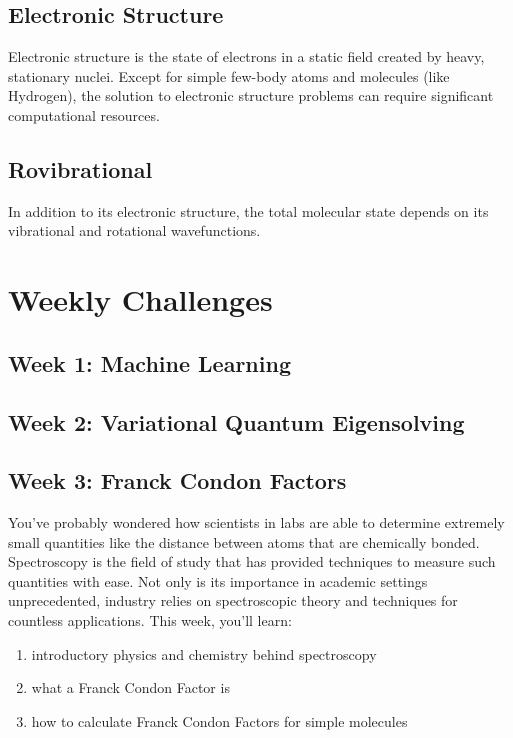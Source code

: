 \documentclass[12pt]{article}
\begin{document}
\subsection*{Electronic Structure}

Electronic structure is the state of electrons in a static field created by heavy, stationary nuclei.
Except for simple few-body atoms and molecules (like Hydrogen), the solution to electronic structure problems can require significant computational resources.

\subsection*{Rovibrational }

In addition to its electronic structure, the total molecular state depends on its vibrational and rotational wavefunctions.


\newpage

\section{Weekly Challenges}

\subsection{Week 1: Machine Learning}

\subsection{Week 2: Variational Quantum Eigensolving}

\newpage

\subsection{Week 3: Franck Condon Factors}

You've probably wondered how scientists in labs are able to determine extremely small quantities like the distance between atoms that are chemically bonded. 
Spectroscopy is the field of study that has provided techniques to measure such quantities with ease. Not only is its importance in academic settings unprecedented, industry relies on spectroscopic theory and techniques for countless applications. This week, you'll learn:

\begin{enumerate}
    \item introductory physics and chemistry behind spectroscopy
    \item what a Franck Condon Factor is
    \item how to calculate Franck Condon Factors for simple molecules
\end{enumerate}
\end{document}
